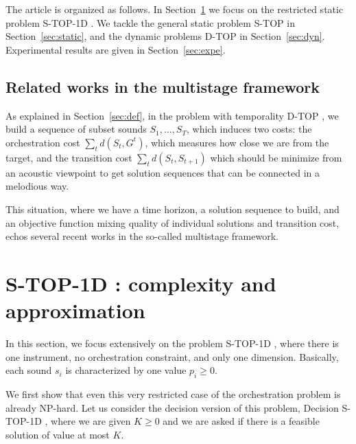 \documentclass[a4paper]{book}
\newtheorem{definition}{Definition}
\newcommand{\stat}{{\sc S-TOP }}
\newcommand{\statoned}{{\sc S-TOP-1D }}
\newcommand{\dyn}{{\sc D-TOP }}
\begin{document}
The article is organized as follows. In Section~\ref{sec:1dnoc} we focus on the restricted static problem \statoned. We tackle the general static problem \stat in Section~\ref{sec:static}, and the dynamic problems \dyn in Section~\ref{sec:dyn}. Experimental results are given in Section~\ref{sec:expe}. 


\subsection{Related works in the {\sc multistage} framework}

As explained in Section~\ref{sec:def}, in the problem with temporality \dyn, we build a sequence of subset sounds $S_1,\dots,S_T$, which induces two costs: the orchestration cost $\sum_t d(S_t,G^t)$, which measures how close we are from the target, and the transition cost $\sum_t d(S_t,S_{t+1})$ which should be minimize from an acoustic viewpoint to get solution sequences that can be connected in a melodious way.

This situation, where we have a time horizon, a solution sequence to build, and an objective function mixing quality of individual solutions and transition cost, echos several recent works in the so-called multistage framework.





\section{\statoned: complexity and approximation}\label{sec:1dnoc}

In this section, we focus extensively on the problem \statoned, where there is one instrument, no orchestration constraint, and only one dimension. Basically, each sound $s_i$ is characterized by one value $p_i\geq 0$. 

We first show that even this very restricted case of the orchestration problem is already NP-hard. Let us consider the decision version of this problem, {\sc Decision} \statoned, where we are given $K\geq 0$ and we are asked if there is a feasible solution of value at most $K$. 



\end{document}
